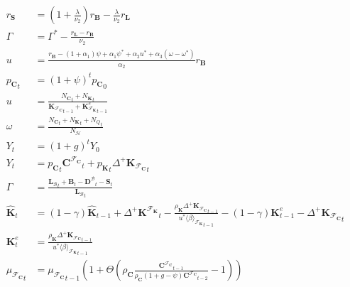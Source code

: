 \documentclass[a4paper, headings=standardclasses]{scrartcl}
\numberwithin{equation}{subsection}
\begin{document}
{\begin{align}
		r_\mathbf{S}  & = \left(1+\frac{\lambda}{\nu_2}\right){r_\mathbf{B}} - \frac{\lambda}{\nu_2} r_\mathbf{L} \\
		\Gamma &= \Gamma^* - \frac{{r_\mathbf{L}} - {r_\mathbf{B}}}{\nu_2} \\
		u &= \frac{r_\mathbf{B} - (1+\alpha_1)\psi + \alpha_1 \psi^* + \alpha_2 u^* + \alpha_3 (\omega - \omega^*)}{\alpha_2}
		{r_\mathbf{B}} \\
		{p_\mathbf{C}}_t &= (1 + \psi)^t {p_\mathbf{C}}_0 \\
		u                                               & = \frac{{N_\mathbf{C}}_t + {N_\mathbf{K}}_t}{{\mathbf{K}_{\mathcal{F}_\mathbf{C}}}_{t-1} + {\mathbf{K}_{\mathcal{F}_\mathbf{K}}^e}_{t-1}} \\
		\omega                                          & = \frac{{N_\mathbf{C}}_t + {N_\mathbf{K}}_t + {N_Q}_t}{N_\mathcal{H}}                                                                                                                                                                             \\
		Y_t & = (1+g)^t Y_0\\
		Y_t                                               & = {p_\mathbf{C}}_t{\mathbf{C}^{\mathcal{F}_\mathbf{C}}}_t + {p_\mathbf{K}}_t {\Delta^+\mathbf{K}_{\mathcal{F}_\mathbf{C}}}_t     \\
		\Gamma                                          & = \frac{{\mathbf{L}_\mathcal{B}}_t + \mathbf{B}_t - {\mathbf{D}^\mathcal{B}}_t - \mathbf{S}_t}{{\mathbf{L}_\mathcal{B}}_t}            \\
		{\hat{\mathbf{K}}}_t                              & = (1-\gamma) \hat{\mathbf{K}}_{t-1} + {\Delta^+\mathbf{K}^{\mathcal{F}_\mathbf{K}}}_t - \frac{\rho_\mathbf{K} {\Delta^+\mathbf{K}_{\mathcal{F}_\mathbf{C}}}_{t-1}}{u^* {\langle \beta \rangle_{\mathcal{F}_\mathbf{K}}}_{t-1}} - (1-\gamma) \mathbf{K}^e_{t-1} - {\Delta^+\mathbf{K}_{\mathcal{F}_\mathbf{C}}}_t    \\
		{\mathbf{K}}^e_t                              & = \frac{\rho_\mathbf{K} {\Delta^+\mathbf{K}_{\mathcal{F}_\mathbf{C}}}_{t-1}}{u^* {\langle \beta \rangle_{\mathcal{F}_\mathbf{K}}}_{t-1}} \\
		{\mu_{\mathcal{F}_\mathbf{C}}}_t                  & = {\mu_{\mathcal{F}_\mathbf{C}}}_{t-1}\left(1+ \Theta \left(\rho_\mathbf{C} \frac{{\mathbf{C}^{\mathcal{F}_\mathbf{C}}}_{t-1}}{\rho_\mathbf{C} (1 + g - \psi) {\mathbf{C}^{\mathcal{F}_\mathbf{C}}}_{t-2}} - 1\right) \right)                                                                              \\

\end{align}}
\end{document}
